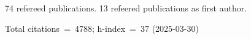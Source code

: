 74 refereed publications. 13 refeered publications as first author.

Total citations~=~4788; h-index~=~37 (2025-03-30)